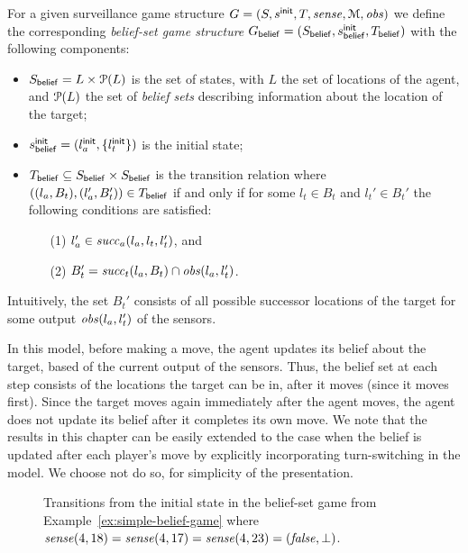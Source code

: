 For a given surveillance game structure $G  = (S,s^{\mathsf{init}},T,\mathit{sense},\mathcal M, \mathit{obs})$ we define the corresponding \emph{belief-set game structure} $G_{\mathsf{belief}}  = (S_{\mathsf{belief}},s^{\mathsf{init}}_{\mathsf{belief}},T_{\mathsf{belief}})$ with the following components:
\begin{itemize}
\item $S_{\mathsf{belief}} = L \times \mathcal{P}(L)$ is the set of states, with $L$ the set of locations of the agent, and $\mathcal{P}(L)$ the set of \emph{belief sets} describing information about the location of the target;
\item $s^{\mathsf{init}}_{\mathsf{belief}} = (l_a^{\mathsf{init}},\{l_t^{\mathsf{init}}\})$ is the initial state;
\item $T_{\mathsf{belief}} \subseteq S_{\mathsf{belief}} \times S_{\mathsf{belief}}$ is the transition relation where $((l_a, B_t),(l_a', B_t')) \in T_{\mathsf{belief}}$ if and only if for some $l_t \in B_t$ and $l_t' \in B_t'$ the following conditions are satisfied:
\begin{itemize}
    \item[(1)] $l_a' \in  \mathit{succ}_a(l_a,l_t,l_t')$, and
    \item[(2)] $B_t' = \mathit{succ}_t(l_a,B_t) \cap \mathit{obs}(l_a,l_t')$.
\end{itemize}

\end{itemize}
Intuitively, the set $B_t'$ consists of all possible successor locations of the target for some output $\mathit{obs}(l_a,l_t')$ of the sensors.  

\bigskip
{} In this model, before making a move, the agent updates its belief about the target, based of the current output of the sensors. Thus, the belief set at each step consists of the locations the target can be in, after it moves (since it moves first). Since the target moves again immediately after the agent moves, the agent does not update its belief after it completes its own move. We note that the results in this chapter can be easily extended to the case when the belief is updated after each player's move by explicitly incorporating turn-switching in the model. We choose not do so, for simplicity of the presentation.

\begin{figure}

\caption{Transitions from the initial state in the belief-set game from Example~\ref{ex:simple-belief-game} where $\mathit{sense}(4,18)=\mathit{sense}(4,17) = \mathit{sense}(4,23) = (\mathit{false},\bot)$.}
\label{fig:simple-belief-game}

\end{figure}

